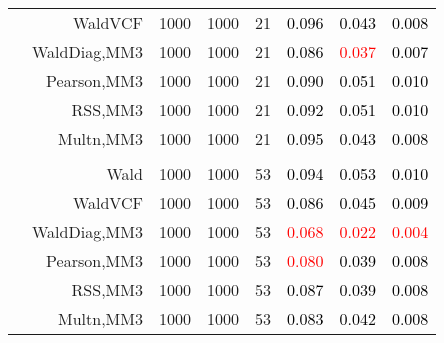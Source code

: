 \documentclass[
]{article}
\begin{document}
\begin{table}[H]
{\begin{tabular}[t]{lrrrrrrr}
\hspace{1em} & WaldVCF & 1000 & 1000 & 21 & \textcolor{black}{0.096} & \textcolor{black}{0.043} & \textcolor{black}{0.008}\\

\hspace{1em} & WaldDiag,MM3 & 1000 & 1000 & 21 & \textcolor{black}{0.086} & \textcolor{red}{0.037} & \textcolor{black}{0.007}\\

\hspace{1em} & Pearson,MM3 & 1000 & 1000 & 21 & \textcolor{black}{0.090} & \textcolor{black}{0.051} & \textcolor{black}{0.010}\\

\hspace{1em} & RSS,MM3 & 1000 & 1000 & 21 & \textcolor{black}{0.092} & \textcolor{black}{0.051} & \textcolor{black}{0.010}\\

\hspace{1em} & Multn,MM3 & 1000 & 1000 & 21 & \textcolor{black}{0.095} & \textcolor{black}{0.043} & \textcolor{black}{0.008}\\
\cmidrule{1-8}
\addlinespace[0.3em]
\multicolumn{8}{l}{\textbf{3F 15V}}\\
\hspace{1em} & Wald & 1000 & 1000 & 53 & \textcolor{black}{0.094} & \textcolor{black}{0.053} & \textcolor{black}{0.010}\\

\hspace{1em} & WaldVCF & 1000 & 1000 & 53 & \textcolor{black}{0.086} & \textcolor{black}{0.045} & \textcolor{black}{0.009}\\

\hspace{1em} & WaldDiag,MM3 & 1000 & 1000 & 53 & \textcolor{red}{0.068} & \textcolor{red}{0.022} & \textcolor{red}{0.004}\\

\hspace{1em} & Pearson,MM3 & 1000 & 1000 & 53 & \textcolor{red}{0.080} & \textcolor{black}{0.039} & \textcolor{black}{0.008}\\

\hspace{1em} & RSS,MM3 & 1000 & 1000 & 53 & \textcolor{black}{0.087} & \textcolor{black}{0.039} & \textcolor{black}{0.008}\\

\hspace{1em} & Multn,MM3 & 1000 & 1000 & 53 & \textcolor{black}{0.083} & \textcolor{black}{0.042} & \textcolor{black}{0.008}\\
\bottomrule
\end{tabular}}
\endgroup{}
\end{table}
\end{document}
